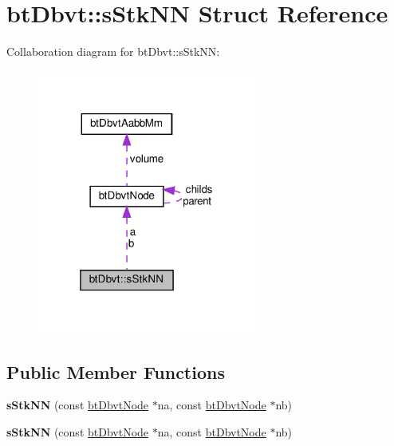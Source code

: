\hypertarget{structbtDbvt_1_1sStkNN}{}\section{bt\+Dbvt\+:\+:s\+Stk\+NN Struct Reference}
\label{structbtDbvt_1_1sStkNN}


Collaboration diagram for bt\+Dbvt\+:\+:s\+Stk\+NN\+:
\nopagebreak
\begin{figure}[H]
\begin{center}
\leavevmode
\includegraphics[width=205pt]{structbtDbvt_1_1sStkNN__coll__graph}
\end{center}
\end{figure}
\subsection*{Public Member Functions}
\begin{DoxyCompactItemize}
\item 
\mbox{\label{structbtDbvt_1_1sStkNN_acd85b4e34cf3b692cf8e9df562a18373}} 
{\bfseries s\+Stk\+NN} (const \hyperlink{structbtDbvtNode}{bt\+Dbvt\+Node} $\ast$na, const \hyperlink{structbtDbvtNode}{bt\+Dbvt\+Node} $\ast$nb)
\item 
\mbox{\label{structbtDbvt_1_1sStkNN_acd85b4e34cf3b692cf8e9df562a18373}} 
{\bfseries s\+Stk\+NN} (const \hyperlink{structbtDbvtNode}{bt\+Dbvt\+Node} $\ast$na, const \hyperlink{structbtDbvtNode}{bt\+Dbvt\+Node} $\ast$nb)
\end{DoxyCompactItemize}
